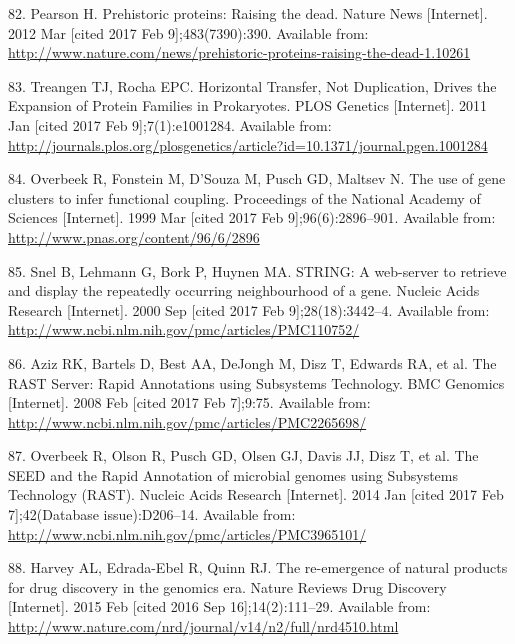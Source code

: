 \documentclass[12pt,twoside]{reedthesis}
\begin{document}
{  \hypertarget{ref-pearson_prehistoric_2012}{}
  82. Pearson H. Prehistoric proteins: Raising the dead. Nature News
  {[}Internet{]}. 2012 Mar {[}cited 2017 Feb 9{]};483(7390):390. Available
  from:
  \url{http://www.nature.com/news/prehistoric-proteins-raising-the-dead-1.10261}
  
  \hypertarget{ref-treangen_horizontal_2011}{}
  83. Treangen TJ, Rocha EPC. Horizontal Transfer, Not Duplication, Drives
  the Expansion of Protein Families in Prokaryotes. PLOS Genetics
  {[}Internet{]}. 2011 Jan {[}cited 2017 Feb 9{]};7(1):e1001284. Available
  from:
  \url{http://journals.plos.org/plosgenetics/article?id=10.1371/journal.pgen.1001284}
  
  \hypertarget{ref-overbeek_use_1999}{}
  84. Overbeek R, Fonstein M, D'Souza M, Pusch GD, Maltsev N. The use of
  gene clusters to infer functional coupling. Proceedings of the National
  Academy of Sciences {[}Internet{]}. 1999 Mar {[}cited 2017 Feb
  9{]};96(6):2896--901. Available from:
  \url{http://www.pnas.org/content/96/6/2896}
  
  \hypertarget{ref-snel_string_2000}{}
  85. Snel B, Lehmann G, Bork P, Huynen MA. STRING: A web-server to
  retrieve and display the repeatedly occurring neighbourhood of a gene.
  Nucleic Acids Research {[}Internet{]}. 2000 Sep {[}cited 2017 Feb
  9{]};28(18):3442--4. Available from:
  \url{http://www.ncbi.nlm.nih.gov/pmc/articles/PMC110752/}
  
  \hypertarget{ref-aziz_rast_2008}{}
  86. Aziz RK, Bartels D, Best AA, DeJongh M, Disz T, Edwards RA, et al.
  The RAST Server: Rapid Annotations using Subsystems Technology. BMC
  Genomics {[}Internet{]}. 2008 Feb {[}cited 2017 Feb 7{]};9:75. Available
  from: \url{http://www.ncbi.nlm.nih.gov/pmc/articles/PMC2265698/}
  
  \hypertarget{ref-overbeek_seed_2014}{}
  87. Overbeek R, Olson R, Pusch GD, Olsen GJ, Davis JJ, Disz T, et al.
  The SEED and the Rapid Annotation of microbial genomes using Subsystems
  Technology (RAST). Nucleic Acids Research {[}Internet{]}. 2014 Jan
  {[}cited 2017 Feb 7{]};42(Database issue):D206--14. Available from:
  \url{http://www.ncbi.nlm.nih.gov/pmc/articles/PMC3965101/}
  
  \hypertarget{ref-harvey_re-emergence_2015}{}
  88. Harvey AL, Edrada-Ebel R, Quinn RJ. The re-emergence of natural
  products for drug discovery in the genomics era. Nature Reviews Drug
  Discovery {[}Internet{]}. 2015 Feb {[}cited 2016 Sep
  16{]};14(2):111--29. Available from:
  \url{http://www.nature.com/nrd/journal/v14/n2/full/nrd4510.html}
  
}
\end{document}

